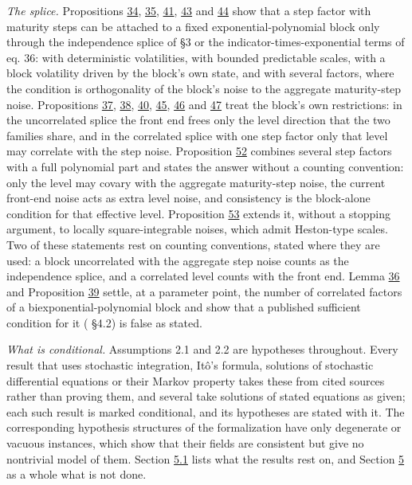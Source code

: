 \documentclass[11pt]{article}
\begin{document}
\emph{The splice.} Propositions \hyperref[res:Proposition-34]{34}, \hyperref[res:Proposition-35]{35}, \hyperref[res:Proposition-41]{41}, \hyperref[res:Proposition-43]{43} and \hyperref[res:Proposition-44]{44} show that a step factor with maturity steps can be attached to a fixed exponential-polynomial block only through the independence splice of \cite{gellert2021short} §3 or the indicator-times-exponential terms of \cite{brace2024sofr} eq. 36: with deterministic volatilities, with bounded predictable scales, with a block volatility driven by the block's own state, and with several factors, where the condition is orthogonality of the block's noise to the aggregate maturity-step noise. Propositions \hyperref[res:Proposition-37]{37}, \hyperref[res:Proposition-38]{38}, \hyperref[res:Proposition-40]{40}, \hyperref[res:Proposition-45]{45}, \hyperref[res:Proposition-46]{46} and \hyperref[res:Proposition-47]{47} treat the block's own restrictions: in the uncorrelated splice the front end frees only the level direction that the two families share, and in the correlated splice with one step factor only that level may correlate with the step noise. Proposition \hyperref[res:Proposition-52]{52} combines several step factors with a full polynomial part and states the answer without a counting convention: only the level may covary with the aggregate maturity-step noise, the current front-end noise acts as extra level noise, and consistency is the block-alone condition for that effective level. Proposition \hyperref[res:Proposition-53]{53} extends it, without a stopping argument, to locally square-integrable noises, which admit Heston-type scales. Two of these statements rest on counting conventions, stated where they are used: a block uncorrelated with the aggregate step noise counts as the independence splice, and a correlated level counts with the front end. Lemma \hyperref[res:Lemma-36]{36} and Proposition \hyperref[res:Proposition-39]{39} settle, at a parameter point, the number of correlated factors of a biexponential-polynomial block and show that a published sufficient condition for it (\cite{sharef2004conditions} §4.2) is false as stated.

\emph{What is conditional.} Assumptions 2.1 and 2.2 are hypotheses throughout. Every result that uses stochastic integration, Itô's formula, solutions of stochastic differential equations or their Markov property takes these from cited sources rather than proving them, and several take solutions of stated equations as given; each such result is marked conditional, and its hypotheses are stated with it. The corresponding hypothesis structures of the formalization have only degenerate or vacuous instances, which show that their fields are consistent but give no nontrivial model of them. Section \hyperref[sec:5.1]{5.1} lists what the results rest on, and Section \hyperref[sec:5]{5} as a whole what is not done.
\end{document}
